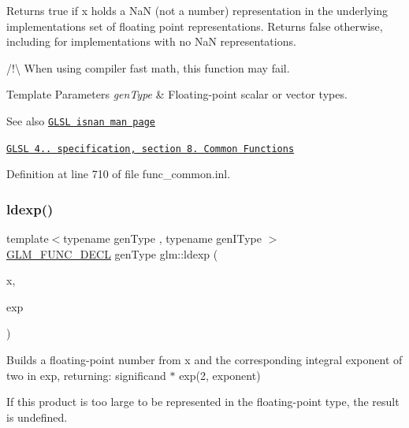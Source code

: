 Returns true if x holds a NaN (not a number) representation in the underlying implementation\textquotesingle{}s set of floating point representations. Returns false otherwise, including for implementations with no NaN representations.

/!\textbackslash{} When using compiler fast math, this function may fail.


\begin{DoxyTemplParams}{Template Parameters}
{\em gen\+Type} & Floating-\/point scalar or vector types.\\
\hline
\end{DoxyTemplParams}
\begin{DoxySeeAlso}{See also}
\href{http://www.opengl.org/sdk/docs/manglsl/xhtml/isnan.xml}{\tt G\+L\+SL isnan man page} 

\href{http://www.opengl.org/registry/doc/GLSLangSpec.4.20.8.pdf}{\tt G\+L\+SL 4.. specification, section 8. Common Functions} 
\end{DoxySeeAlso}


Definition at line 710 of file func\+\_\+common.\+inl.

\mbox{\label{group__core__func__common_ga52e319d7289b849ec92055abd4830533}} 
\subsubsection{\texorpdfstring{ldexp()}{ldexp()}}
{\footnotesize\ttfamily template$<$typename gen\+Type , typename gen\+I\+Type $>$ \\
\hyperlink{setup_8hpp_ab2d052de21a70539923e9bcbf6e83a51}{G\+L\+M\+\_\+\+F\+U\+N\+C\+\_\+\+D\+E\+CL} gen\+Type glm\+::ldexp (\begin{DoxyParamCaption}\item[{gen\+Type const \&}]{x,  }\item[{gen\+I\+Type const \&}]{exp }\end{DoxyParamCaption})}

Builds a floating-\/point number from x and the corresponding integral exponent of two in exp, returning\+: significand $\ast$ exp(2, exponent)

If this product is too large to be represented in the floating-\/point type, the result is undefined.



